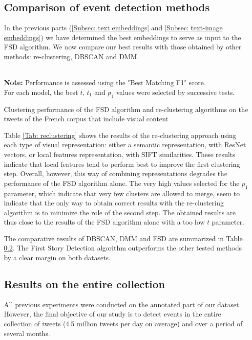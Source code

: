 \subsection{Comparison of event detection methods}

In the previous parts (\ref{Subsec: text embeddings} and \ref{Subsec: text-image embeddings})  we have determined the best embeddings to serve as input to the FSD algorithm. We now compare our best results with those obtained by other methods: re-clustering, DBSCAN and DMM.

\begin{table}[ht]
\begin{center}

\\

{\scriptsize \textbf{Note:} Performance is assessed using the "Best Matching F1" score.\\ 
For each model, the best $t$, $t_1$ and $p_1$ values were selected by successive tests.}
\caption{Clustering performance of the FSD algorithm and re-clustering algorithms on the tweets of the French corpus that include visual content} \label{Tab: reclustering}
\end{center}
\end{table}
Table \ref{Tab: reclustering} shows the results of the re-clustering approach using each type of visual representation: either a semantic representation, with ResNet vectors, or local features representation, with SIFT similarities. These results indicate that local features tend to perform best to improve the first clustering step. Overall, however, this way of combining representations degrades the performance of the FSD algorithm alone. The very high values selected for the $p_1$ parameter, which indicate that very few clusters are allowed to merge, seem to indicate that the only way to obtain correct results with the re-clustering algorithm is to minimize the role of the second step. The obtained results are thus close to the results of the FSD algorithm alone with a too low $t$ parameter.

The comparative results of DBSCAN, DMM and FSD are summarized in Table \ref{}. The First Story Detection algorithm outperforms the other tested methods by a clear margin on both datasets.

\subsection{Results on the entire collection}
All previous experiments were conducted on the annotated part of our dataset. However, the final objective of our study is to detect events in the entire collection of tweets (4.5 million tweets per day on average) and over a period of several months. 

